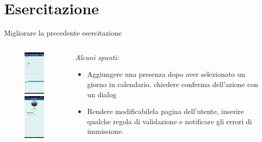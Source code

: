 \documentclass{../libs/presentation_format}
\begin{document}
\section{Esercitazione}
\begin{frame}{Migliorare la precedente esercitazione}
	\begin{minipage}[0.2\textheight]{\textwidth}
		\begin{columns}[T]
			\begin{column}{0.4\textwidth}
				\begin{figure}[htpb]
					\centering
					\includegraphics[width=2cm]{../libs/assignment-calendar}
					\includegraphics[width=2cm]{../libs/assignment-profile}
				\end{figure}
			\end{column}
			\begin{column}{0.6\textwidth}
				\emph{Alcuni spunti:}
				\begin{itemize}
					\item Aggiungere una presenza dopo aver selezionato un giorno in calendario, chiedere conferma dell'azione con un dialog
					\item Rendere modificabilela pagina dell'utente, inserire qualche regola di validazione e notificare gli errori di immissione.
				\end{itemize}
			\end{column}
		\end{columns}
	\end{minipage}
\end{frame}

\end{document}
